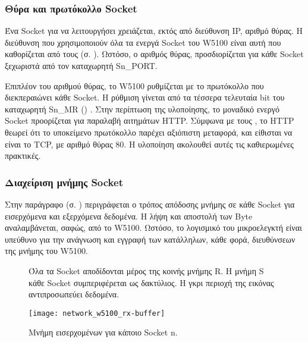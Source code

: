 \subsubsection{Θύρα και πρωτόκολλο Socket}
\label{ssubsec:network:port_mr}

Ένα Socket για να λειτουργήσει χρειάζεται, εκτός από διεύθυνση IP, αριθμό θύρας.
Η διεύθυνση που χρησιμοποιούν όλα τα ενεργά Socket του W5100 είναι αυτή που
καθορίζεται από τους
(σ. \pageref{ssubsec:network:addr-registers}).
Ωστόσο, ο αριθμός θύρας, προσδιορίζεται για κάθε Socket ξεχωριστά από τον
καταχωρητή Sn\_PORT.

Επιπλέον του αριθμού θύρας, το W5100 ρυθμίζεται με το πρωτόκολλο που
διεκπεραιώνει κάθε Socket. Η ρύθμιση γίνεται από τα τέσσερα τελευταία bit του
καταχωρητή Sn\_MR () \parencite[25--26]{wiz11:w5100}.
Στην περίπτωση της υλοποίησης, το μοναδικό ενεργό Socket προορίζεται για
παραλαβή αιτημάτων HTTP. Σύμφωνα με τους \textcite[13]{rfc2616}, το HTTP θεωρεί
ότι το υποκείμενο πρωτόκολλο παρέχει αξιόπιστη μεταφορά, και είθισται να είναι
το TCP, με αριθμό θύρας 80. Η υλοποίηση ακολουθεί αυτές τις καθιερωμένες
πρακτικές.


\subsubsection{Διαχείριση μνήμης Socket}

Στην παράγραφο
 (σ. \pageref{ssubsec:network:rmsr_tmsr})
περιγράφεται ο τρόπος απόδοσης μνήμης σε κάθε Socket για εισερχόμενα και
εξερχόμενα δεδομένα. Η λήψη και αποστολή των Byte αναλαμβάνεται, σαφώς, από το
W5100. Ωστόσο, το λογισμικό του μικροελεγκτή είναι υπεύθυνο για την ανάγνωση και
εγγραφή των κατάλληλων, κάθε φορά, διευθύνσεων της μνήμης του W5100.

\begin{figure}
    \caption{Μνήμη εισερχομένων για κάποιο Socket n.
    \label{fig:network:w5100-rx-buffer}}

    Όλα τα Socket αποδίδονται μέρος της κοινής μνήμης R. Η μνήμη
    S κάθε Socket συμπεριφέρεται ως δακτύλιος. Η γκρι περιοχή της
    εικόνας αντιπροσωπεύει δεδομένα.

    \begin{center}
    \texttt{[image: network\_w5100\_rx-buffer]}
    \end{center}
\end{figure}

